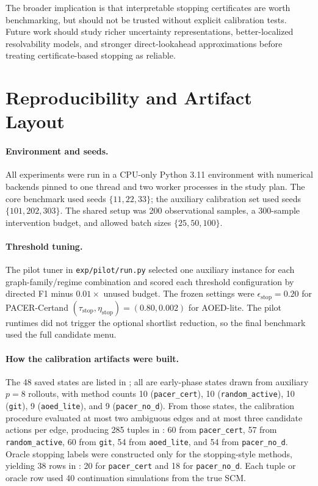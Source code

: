 \documentclass{article}
\newcommand{\method}{PACER-Cert}
\begin{document}
The broader implication is that interpretable stopping certificates are worth benchmarking, but should not be trusted without explicit calibration tests. Future work should study richer uncertainty representations, better-localized resolvability models, and stronger direct-lookahead approximations before treating certificate-based stopping as reliable.




\appendix

\section{Reproducibility and Artifact Layout}
\label{app:repro}

\paragraph{Environment and seeds.}
All experiments were run in a CPU-only Python 3.11 environment with numerical backends pinned to one thread and two worker processes in the study plan. The core benchmark used seeds $\{11,22,33\}$; the auxiliary calibration set used seeds $\{101,202,303\}$. The shared setup was 200 observational samples, a 300-sample intervention budget, and allowed batch sizes $\{25,50,100\}$.

\paragraph{Threshold tuning.}
The pilot tuner in \texttt{exp/pilot/run.py} selected one auxiliary instance for each graph-family/regime combination and scored each threshold configuration by directed F1 minus $0.01\times$ unused budget. The frozen settings were $\epsilon_{\mathrm{stop}}=0.20$ for \method and $(\tau_{\mathrm{stop}},\eta_{\mathrm{stop}})=(0.80,0.002)$ for AOED-lite. The pilot runtimes did not trigger the optional shortlist reduction, so the final benchmark used the full candidate menu.

\paragraph{How the calibration artifacts were built.}
The 48 saved states are listed in ; all are early-phase states drawn from auxiliary $p=8$ rollouts, with method counts 10 (\texttt{pacer\_cert}), 10 (\texttt{random\_active}), 10 (\texttt{git}), 9 (\texttt{aoed\_lite}), and 9 (\texttt{pacer\_no\_d}). From those states, the calibration procedure evaluated at most two ambiguous edges and at most three candidate actions per edge, producing 285 tuples in : 60 from \texttt{pacer\_cert}, 57 from \texttt{random\_active}, 60 from \texttt{git}, 54 from \texttt{aoed\_lite}, and 54 from \texttt{pacer\_no\_d}. Oracle stopping labels were constructed only for the stopping-style methods, yielding 38 rows in : 20 for \texttt{pacer\_cert} and 18 for \texttt{pacer\_no\_d}. Each tuple or oracle row used 40 continuation simulations from the true SCM.
\end{document}
